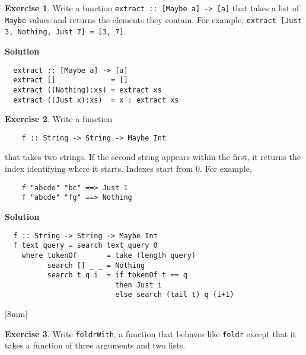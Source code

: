 \documentclass[11pt,a4paper]{article}
\theoremstyle{definition}
\newtheorem{exr}{Exercise}
\begin{document}
\vspace{5mm}

\begin{exr}
  Write a function \texttt{extract :: [Maybe a] -> [a]} that takes a list of 
  \texttt{Maybe} values and returns the elements they contain. For example, 
  \texttt{extract [Just 3, Nothing, Just 7] = [3, 7]}.
\end{exr}

\textbf{Solution}
\begin{lstlisting}
  extract :: [Maybe a] -> [a]
  extract []             = []
  extract ((Nothing):xs) = extract xs
  extract ((Just x):xs)  = x : extract xs
\end{lstlisting}


\vspace{5mm}

\begin{exr}
  Write a function

  \begin{lstlisting}
    f :: String -> String -> Maybe Int
  \end{lstlisting}

  that takes two strings. If the second string appears within the first, 
  it returns the index identifying where it starts. Indexes start from 0. 
  For example,

  \begin{lstlisting}
    f "abcde" "bc" ==> Just 1
    f "abcde" "fg" ==> Nothing
  \end{lstlisting}
\end{exr}

\textbf{Solution}
\begin{lstlisting}
  f :: String -> String -> Maybe Int
  f text query = search text query 0
    where tokenOf       = take (length query)
          search [] _ _ = Nothing
          search t q i  = if tokenOf t == q
                          then Just i
                          else search (tail t) q (i+1)
\end{lstlisting}


[8mm]

\begin{exr}
  Write \texttt{foldrWith}, a function that behaves like \texttt{foldr} except 
  that it takes a function of three arguments and two lists.
\end{exr}
\end{document}
